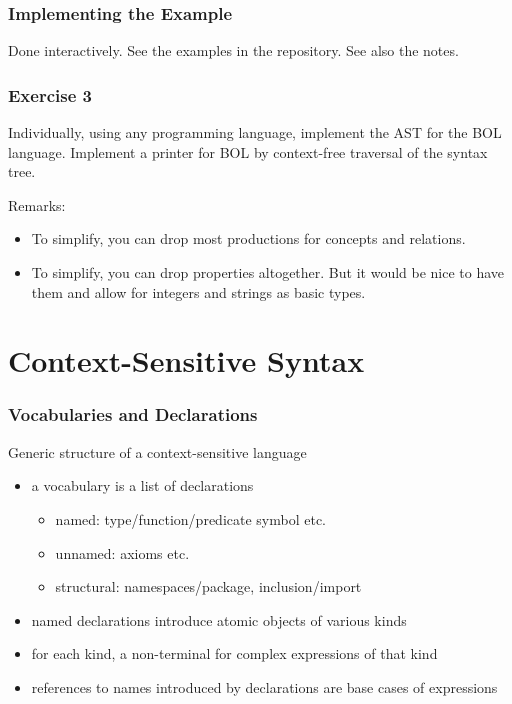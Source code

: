 \begin{frame}\frametitle{Implementing the Example}
Done interactively. See the examples in the repository. See also the notes.
\end{frame}

\begin{frame}\frametitle{Exercise 3}
Individually, using any programming language, implement the AST for the BOL language.
Implement a printer for BOL by context-free traversal of the syntax tree.

Remarks:
\begin{itemize}
\item To simplify, you can drop most productions for concepts and relations.
\item To simplify, you can drop properties altogether. But it would be nice to have them and allow for integers and strings as basic types.
\end{itemize}
\end{frame}

\section{Context-Sensitive Syntax}

\begin{frame}\frametitle{Vocabularies and Declarations}
Generic structure of a context-sensitive language
\begin{itemize}
 \item a vocabulary is a list of declarations
  \begin{itemize}
  \item named: type/function/predicate symbol etc.
  \item unnamed: axioms etc.
  \item structural: namespaces/package, inclusion/import
  \end{itemize}
 \item named declarations introduce atomic objects of various kinds
 \item for each kind, a non-terminal for complex expressions of that kind
 \item references to names introduced by declarations are base cases of expressions
\end{itemize}
\end{frame}

